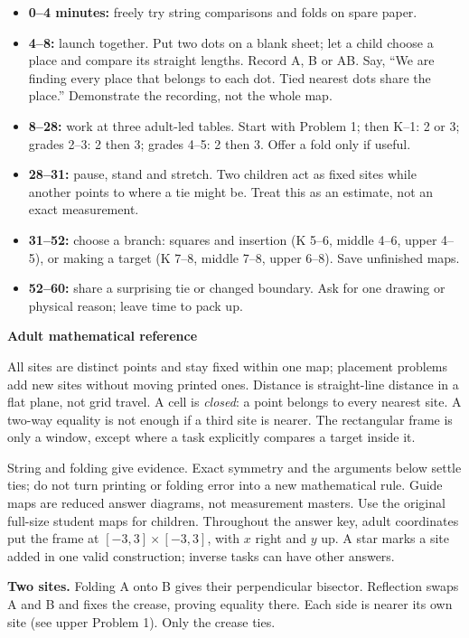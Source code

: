 \documentclass[letterpaper,11pt]{article}
\newcommand{\heading}[1]{\par\vspace{5pt}{\large\bfseries #1}\par}
\begin{document}
\heading{A flexible hour}
\begin{itemize}
\item \textbf{0--4 minutes:} freely try string comparisons and folds on spare paper.
\item \textbf{4--8:} launch together. Put two dots on a blank sheet; let a child choose a place and compare its straight lengths. Record A, B or AB. Say, ``We are finding every place that belongs to each dot. Tied nearest dots share the place.'' Demonstrate the recording, not the whole map.
\item \textbf{8--28:} work at three adult-led tables. Start with Problem 1; then K--1: 2 or 3; grades 2--3: 2 then 3; grades 4--5: 2 then 3. Offer a fold only if useful.
\item \textbf{28--31:} pause, stand and stretch. Two children act as fixed sites while another points to where a tie might be. Treat this as an estimate, not an exact measurement.
\item \textbf{31--52:} choose a branch: squares and insertion (K 5--6, middle 4--6, upper 4--5), or making a target (K 7--8, middle 7--8, upper 6--8). Save unfinished maps.
\item \textbf{52--60:} share a surprising tie or changed boundary. Ask for one drawing or physical reason; leave time to pack up.
\end{itemize}
\newpage
\begingroup\fontsize{10.5}{12.4}\selectfont
{\Large\bfseries Adult mathematical reference}\par
\heading{Shared conventions and fidelity limits}
All sites are distinct points and stay fixed within one map; placement problems add new sites without moving printed ones. Distance is straight-line distance in a flat plane, not grid travel. A cell is \emph{closed}: a point belongs to every nearest site. A two-way equality is not enough if a third site is nearer. The rectangular frame is only a window, except where a task explicitly compares a target inside it.

String and folding give evidence. Exact symmetry and the arguments below settle ties; do not turn printing or folding error into a new mathematical rule. Guide maps are reduced answer diagrams, not measurement masters. Use the original full-size student maps for children. Throughout the answer key, adult coordinates put the frame at $[-3,3]\times[-3,3]$, with $x$ right and $y$ up. A star marks a site added in one valid construction; inverse tasks can have other answers.

\heading{Why the methods work}
\textbf{Two sites.} Folding A onto B gives their perpendicular bisector. Reflection swaps A and B and fixes the crease, proving equality there. Each side is nearer its own site (see upper Problem 1). Only the crease ties.
\end{document}
